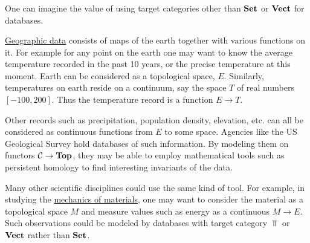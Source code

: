 \documentclass[CT4S-EN-RU]{subfiles}
\begin{document}

\subsubsection{}\label{sec:other targets}

\begin{blockENG}
One can imagine the value of using target categories other than ${\mathbf{Set}}$ or ${\mathbf{Vect}}$ for databases. 
\end{blockENG}

\begin{blockRUS}
\end{blockRUS}

\begin{applicationENG}
\href{http://en.wikipedia.org/wiki/Geographic_data}{\text Geographic data} consists of maps of the earth together with various functions on it. For example for any point on the earth one may want to know the average temperature recorded in the past 10 years, or the precise temperature at this moment. Earth can be considered as a topological space, $E$. Similarly, temperatures on earth reside on a continuum, say the space $T$ of real numbers $[-100,200]$. Thus the temperature record is a function $E\to T$. 

Other records such as precipitation, population density, elevation, etc. can all be considered as continuous functions from $E$ to some space. Agencies like the US Geological Survey hold databases of such information. By modeling them on functors $\mathcal{C}\rightarrow{\mathbf{Top}}$, they may be able to employ mathematical tools such as persistent homology \cite{WeS} to find interesting invariants of the data.
\end{applicationENG}

\begin{applicationRUS}
\end{applicationRUS}

\begin{applicationENG}
Many other scientific disciplines could use the same kind of tool. For example, in studying the \href{http://en.wikipedia.org/wiki/Strength_of_materials}{\text mechanics of materials}, one may want to consider the material as a topological space $M$ and measure values such as energy as a continuous $M\to E$. Such observations could be modeled by databases with target category $\Top$ or ${\mathbf{Vect}}$ rather than ${\mathbf{Set}}$.
\end{applicationENG}
\end{document}
